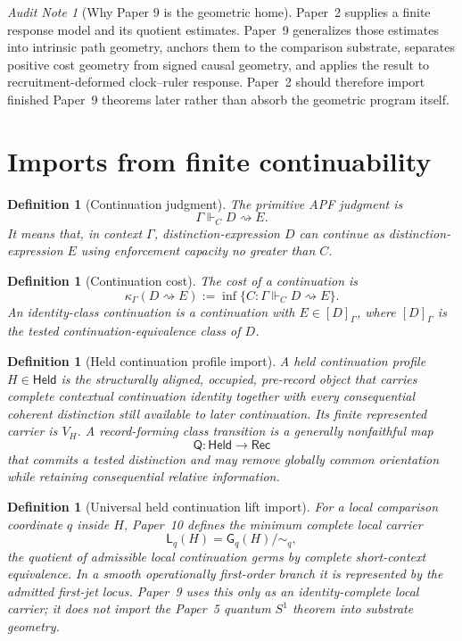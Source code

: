 \documentclass[11pt]{article}
\newtheorem{definition}[theorem]{Definition}
\theoremstyle{remark}
\newtheorem{audit}[theorem]{Audit Note}
\newcommand{\G}{\Gamma}
\newcommand{\entails}{\Vdash}
\newcommand{\goes}{\rightsquigarrow}
\newcommand{\Cost}{\kappa}
\newcommand{\Held}{\mathsf{Held}}
\newcommand{\Rec}{\mathsf{Rec}}
\newcommand{\VH}{V_H}
\newcommand{\Qrec}{\mathsf Q}
\begin{document}
\begin{audit}[Why Paper 9 is the geometric home]
Paper~2 supplies a finite response model and its quotient estimates.  Paper~9 generalizes those estimates into intrinsic path geometry, anchors them to the comparison substrate, separates positive cost geometry from signed causal geometry, and applies the result to recruitment-deformed clock--ruler response.  Paper~2 should therefore import finished Paper~9 theorems later rather than absorb the geometric program itself.
\end{audit}

\section{Imports from finite continuability}

\begin{definition}[Continuation judgment]
The primitive APF judgment is
\[
        \G\entails_C D\goes E.
\]
It means that, in context \(\G\), distinction-expression \(D\) can continue as distinction-expression \(E\) using enforcement capacity no greater than \(C\).
\end{definition}

\begin{definition}[Continuation cost]
The cost of a continuation is
\[
        \Cost_\G(D\goes E)
        :=
        \inf\{C:\G\entails_C D\goes E\}.
\]
An identity-class continuation is a continuation with \(E\in[D]_\G\), where \([D]_\G\) is the tested continuation-equivalence class of \(D\).
\end{definition}


\begin{definition}[Held continuation profile import]
A held continuation profile $H\in\Held$ is the structurally aligned, occupied, pre-record object that carries complete contextual continuation identity together with every consequential coherent distinction still available to later continuation.  Its finite represented carrier is $\VH$.  A record-forming class transition is a generally nonfaithful map
\[
\Qrec:\Held\longrightarrow\Rec
\]
that commits a tested distinction and may remove globally common orientation while retaining consequential relative information.
\end{definition}

\begin{definition}[Universal held continuation lift import]
For a local comparison coordinate $q$ inside $H$, Paper~10 defines the minimum complete local carrier
\[
\mathsf L_q(H)=\mathsf G_q(H)/\!\sim_q,
\]
the quotient of admissible local continuation germs by complete short-context equivalence.  In a smooth operationally first-order branch it is represented by the admitted first-jet locus.  Paper~9 uses this only as an identity-complete local carrier; it does not import the Paper~5 quantum $S^1$ theorem into substrate geometry.
\end{definition}
\end{document}
